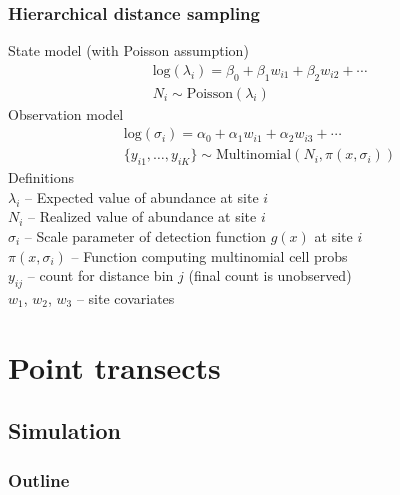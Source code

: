 \documentclass[color=usenames,dvipsnames]{beamer}\usepackage[]{graphicx}\usepackage[]{xcolor}
\begin{document}
\begin{frame}
  \frametitle{Hierarchical distance sampling}
  \small
  State model (with Poisson assumption)
  \begin{gather*}
    \mathrm{log}(\lambda_i) = \beta_0 + \beta_1 {w_{i1}} +
    \beta_2 {w_{i2}} + \cdots \\
    N_i \sim \mathrm{Poisson}(\lambda_i)
  \end{gather*}
  \pause
  Observation model
  \begin{gather*}
    \mathrm{log}(\sigma_{i}) = \alpha_0 + \alpha_1 {w_{i1}}
    + \alpha_2 {w_{i3}} + \cdots \\
    \{y_{i1}, \dots, y_{iK}\}  \sim \mathrm{Multinomial}(N_i,
    \pi(x, \sigma_i))
  \end{gather*}
  \pause
  \small
  Definitions \\
  $\lambda_i$ -- Expected value of abundance at site $i$ \\
  $N_i$ -- Realized value of abundance at site $i$ \\
  $\sigma_{i}$ -- Scale parameter of detection function $g(x)$ at site $i$ \\
  $\pi(x,\sigma_i)$ -- Function computing multinomial cell probs \\
  $y_{ij}$ -- count for distance bin $j$ (final count is unobserved) \\
  $w_1$, $w_2$, $w_3$ -- site covariates %
\end{frame}






\section{Point transects}

\subsection{Simulation}


\begin{frame}
  \frametitle{Outline}
  \Large
\end{frame}
\end{document}
